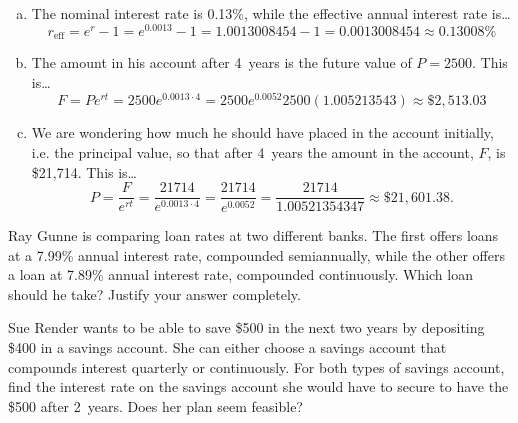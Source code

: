 \documentclass[11pt,letterpaper]{article}
\begin{document}
\begin{enumerate}[(a)]
\item The nominal interest rate is 0.13\%, while the effective annual interest rate is\dots
	\[
	r_{\text{eff}}= e^r - 1= e^{0.0013} - 1= 1.0013008454 - 1= 0.0013008454 \approx 0.13008\%
	\] \pspace

\item The amount in his account after 4~years is the future value of $P= 2500$. This is\dots
	\[
	F= Pe^{rt}= 2500 e^{0.0013 \cdot 4}= 2500 e^{0.0052} 2500(1.005213543) \approx \$2,513.03
	\] \pspace

\item We are wondering how much he should have placed in the account initially, i.e. the principal value, so that after 4~years the amount in the account, $F$, is \$21,714. This is\dots
	\[
	P= \dfrac{F}{e^{rt}}= \dfrac{21714}{e^{0.0013 \cdot 4}}= \dfrac{21714}{e^{0.0052}}= \dfrac{21714}{1.00521354347} \approx \$21,601.38.
	\] 
\end{enumerate}



\newpage



 Ray Gunne is comparing loan rates at two different banks. The first offers loans at a 7.99\% annual interest rate, compounded semiannually, while the other offers a loan at 7.89\% annual interest rate, compounded continuously. Which loan should he take? Justify your answer completely.



\newpage



 Sue Render wants to be able to save \$500 in the next two years by depositing \$400 in a savings account. She can either choose a savings account that compounds interest quarterly or continuously. For both types of savings account, find the interest rate on the savings account she would have to secure to have the \$500 after 2~years. Does her plan seem feasible? 
\end{document}
